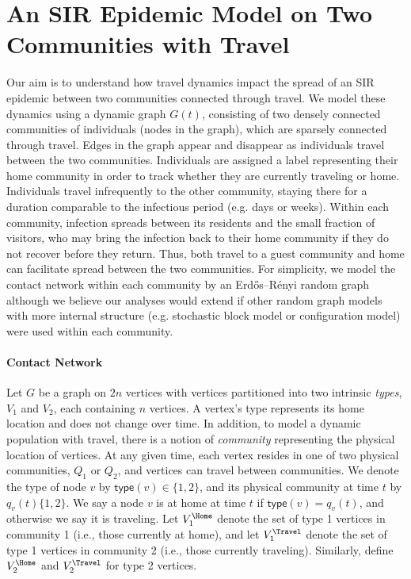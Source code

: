 \documentclass[11pt]{article}
\begin{document}
\section{An SIR Epidemic Model on Two Communities with Travel}

Our aim is to understand how travel dynamics impact the  spread of an SIR epidemic between two communities connected through travel. We model these dynamics using a dynamic graph $G(t)$, consisting of two densely connected communities of individuals (nodes in the graph), which are sparsely connected through travel. Edges in the graph appear and disappear as individuals travel between the two communities. Individuals are assigned a label representing their home community in order to track whether they are currently traveling or home. Individuals travel infrequently to the other community, staying there for a duration comparable to the infectious period (e.g. days or weeks). Within each community, infection spreads between its residents and the small fraction of visitors, who may bring the infection back to their home community if they do not recover before they return. Thus, both travel to a guest community and home can facilitate spread between the two communities. For simplicity, we model the contact network within each community by an Erd\H{o}s--R\'enyi random graph although we believe our analyses would extend if other random graph models with more internal structure (e.g. stochastic block model or configuration model) were used within each community.

\paragraph{Contact Network} Let $G$ be a graph on $2n$ vertices with vertices partitioned into two intrinsic \textit{types}, $V_1$ and $V_2$, each containing $n$ vertices. A vertex's type represents its home location and does not change over time. In addition, to model a dynamic population with travel, there is a notion of \emph{community} representing the physical location of vertices. At any given time, each vertex resides in one of two physical communities, $Q_1$ or $Q_2$, and vertices can travel between communities. 
We denote the type of node $v$ by $\mathsf{type}(v)\in\{1,2\}$, and its physical community at time $t$ by $q_v(t)\{1,2\}$.
We say a node $v$ is at home at time $t$ if $\mathsf{type}(v) = q_v(t)$, and otherwise we say it is traveling. 
Let $V_1^\Home$ denote the set of type 1 vertices in community 1 (i.e., those currently at home), and let 
$V_1^\Travel$ denote the set of type 1 vertices in community 2 (i.e., those currently traveling). Similarly, 
define $V_2^\Home$ and $V_2^\Travel$ for type 2 vertices. 
\end{document}
